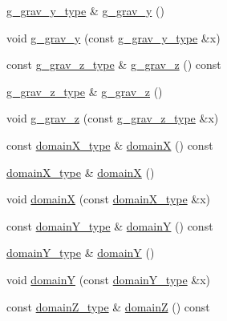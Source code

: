 \begin{DoxyCompactItemize}
\item 
\hyperlink{classsetting__t_a89b3c653de2dc5afa902042e34939589}{g\+\_\+grav\+\_\+y\+\_\+type} \& \hyperlink{classsetting__t_a0a7c51a7eea00f6807e2c5f0137335c3}{g\+\_\+grav\+\_\+y} ()
\item 
void \hyperlink{classsetting__t_af342adc7c8d7b423ad8faf11958822f7}{g\+\_\+grav\+\_\+y} (const \hyperlink{classsetting__t_a89b3c653de2dc5afa902042e34939589}{g\+\_\+grav\+\_\+y\+\_\+type} \&x)
\item 
const \hyperlink{classsetting__t_a2a9e06e642160debeeadb7a76b97c753}{g\+\_\+grav\+\_\+z\+\_\+type} \& \hyperlink{classsetting__t_a5bc9dbb6fb0d1b8fbbe12253b16c8ac7}{g\+\_\+grav\+\_\+z} () const 
\item 
\hyperlink{classsetting__t_a2a9e06e642160debeeadb7a76b97c753}{g\+\_\+grav\+\_\+z\+\_\+type} \& \hyperlink{classsetting__t_a767efdd22d071535b1f4ed770281a9a4}{g\+\_\+grav\+\_\+z} ()
\item 
void \hyperlink{classsetting__t_ae53e0efb23014045e7c46736584bda64}{g\+\_\+grav\+\_\+z} (const \hyperlink{classsetting__t_a2a9e06e642160debeeadb7a76b97c753}{g\+\_\+grav\+\_\+z\+\_\+type} \&x)
\item 
const \hyperlink{classsetting__t_a1bf57fd62042e86d0e1e66f34fbaed31}{domain\+X\+\_\+type} \& \hyperlink{classsetting__t_a9bdf93a03bd1d61dbe77ba659426e938}{domainX} () const 
\item 
\hyperlink{classsetting__t_a1bf57fd62042e86d0e1e66f34fbaed31}{domain\+X\+\_\+type} \& \hyperlink{classsetting__t_a8eeb1b0806acd7ee1af20715d6d2bc8c}{domainX} ()
\item 
void \hyperlink{classsetting__t_ad9a18a2473b12c5abfdd7f909402f270}{domainX} (const \hyperlink{classsetting__t_a1bf57fd62042e86d0e1e66f34fbaed31}{domain\+X\+\_\+type} \&x)
\item 
const \hyperlink{classsetting__t_a9f13bfe9cc42660cf1e89cff4afe9435}{domain\+Y\+\_\+type} \& \hyperlink{classsetting__t_a46f6ec8fbf1196ebe4e137d3b96c098a}{domainY} () const 
\item 
\hyperlink{classsetting__t_a9f13bfe9cc42660cf1e89cff4afe9435}{domain\+Y\+\_\+type} \& \hyperlink{classsetting__t_a8d12c4ae13b1dffc9493eb2acc067aaf}{domainY} ()
\item 
void \hyperlink{classsetting__t_a9fcdd2c53182b2e9c4b0002a30fc059a}{domainY} (const \hyperlink{classsetting__t_a9f13bfe9cc42660cf1e89cff4afe9435}{domain\+Y\+\_\+type} \&x)
\item 
const \hyperlink{classsetting__t_a2257367cc1475e2a9b1b2a82dbdaddaf}{domain\+Z\+\_\+type} \& \hyperlink{classsetting__t_aa09b905cc9332f75b67bfedb5c58e811}{domainZ} () const 

\end{DoxyCompactItemize}
